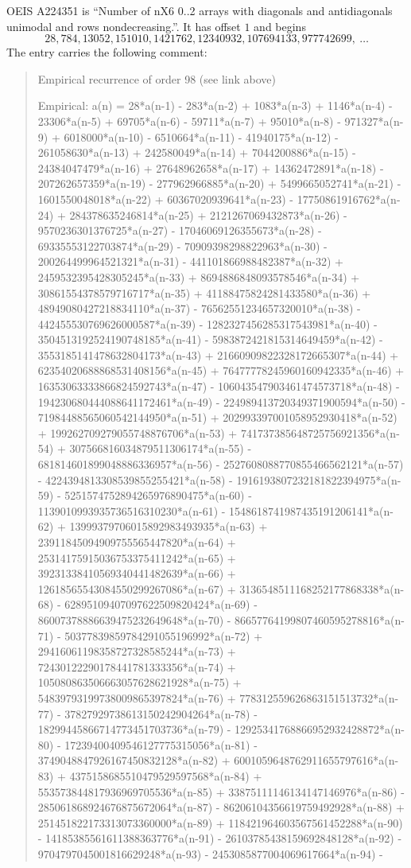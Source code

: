 \documentclass[11pt,a4paper]{article}
\theoremstyle{plain}
\theoremstyle{definition}
\begin{document}
OEIS A224351 is ``Number of nX6 0..2 arrays with diagonals and antidiagonals unimodal and rows nondecreasing.''. It has offset $1$ and begins
\[
28, 784, 13052, 151010, 1421762, 12340932, 107694133, 977742699,\ \dots
\]
The entry carries the following comment:
\begin{quote}\small
Empirical recurrence of order 98 (see link above)

Empirical: a(n) = 28*a(n-1) - 283*a(n-2) + 1083*a(n-3) + 1146*a(n-4) - 23306*a(n-5) + 69705*a(n-6) - 59711*a(n-7) + 95010*a(n-8) - 971327*a(n-9) + 6018000*a(n-10) - 6510664*a(n-11) - 41940175*a(n-12) - 261058630*a(n-13) + 242580049*a(n-14) + 7044200886*a(n-15) - 24384047479*a(n-16) + 27648962658*a(n-17) + 14362472891*a(n-18) - 207262657359*a(n-19) - 277962966885*a(n-20) + 5499665052741*a(n-21) - 1601550048018*a(n-22) + 60367020939641*a(n-23) - 17750861916762*a(n-24) + 284378635246814*a(n-25) + 2121267069432873*a(n-26) - 9570236301376725*a(n-27) - 17046069126355673*a(n-28) - 69335553122703874*a(n-29) - 70909398298822963*a(n-30) - 200264499964521321*a(n-31) - 441101866988482387*a(n-32) + 2459532395428305245*a(n-33) + 8694886848093578546*a(n-34) + 30861554378579716717*a(n-35) + 41188475824281433580*a(n-36) + 48949080427218834110*a(n-37) - 76562551234657320010*a(n-38) - 442455530769626000587*a(n-39) - 1282327456285317543981*a(n-40) - 3504513192524190748185*a(n-41) - 5983872421815314649459*a(n-42) - 3553185141478632804173*a(n-43) + 21660909822328172665307*a(n-44) + 62354020688868531408156*a(n-45) + 76477778245960160942335*a(n-46) + 16353063333866824592743*a(n-47) - 106043547903461474573718*a(n-48) - 194230680444088641172461*a(n-49) - 224989413720349371900594*a(n-50) - 71984488565060542144950*a(n-51) + 202993397001058952930418*a(n-52) + 199262709279055748876706*a(n-53) + 741737385648725756921356*a(n-54) + 307566816034879511306174*a(n-55) - 681814601899048886336957*a(n-56) - 2527608088770855466562121*a(n-57) - 4224394813308539855255421*a(n-58) - 1916193807232181822394975*a(n-59) - 5251574752894265976890475*a(n-60) - 1139010993935736516310230*a(n-61) - 1548618741987435191206141*a(n-62) + 13999379706015892983493935*a(n-63) + 23911845094909755565447820*a(n-64) + 25314175915036753375411242*a(n-65) + 39231338410569340441482639*a(n-66) + 12618565543084550299267086*a(n-67) + 3136548511168252177868338*a(n-68) - 62895109407097622509820424*a(n-69) - 86007378886639475232649648*a(n-70) - 86657764199807460595278816*a(n-71) - 50377839859784291055196992*a(n-72) + 29416061198358727328585244*a(n-73) + 72430122290178441781333356*a(n-74) + 105080863506663057628621928*a(n-75) + 54839793199738009865397824*a(n-76) + 778312559626863151513732*a(n-77) - 37827929738613150242904264*a(n-78) - 18299445866714773451703736*a(n-79) - 12925341768866952932428872*a(n-80) - 17239400409546127775315056*a(n-81) - 3749048847926167450832128*a(n-82) + 6001059648762911655797616*a(n-83) + 4375158685510479529597568*a(n-84) + 553573844817936969705536*a(n-85) + 33875111146134147146976*a(n-86) - 285061868924676875672064*a(n-87) - 86206104356619759492928*a(n-88) + 251451822173313073360000*a(n-89) + 118421964603567561452288*a(n-90) - 14185385561611388363776*a(n-91) - 26103785438159692848128*a(n-92) - 9704797045001816629248*a(n-93) - 2453085877004069617664*a(n-94) - 
\end{quote}
\end{document}
